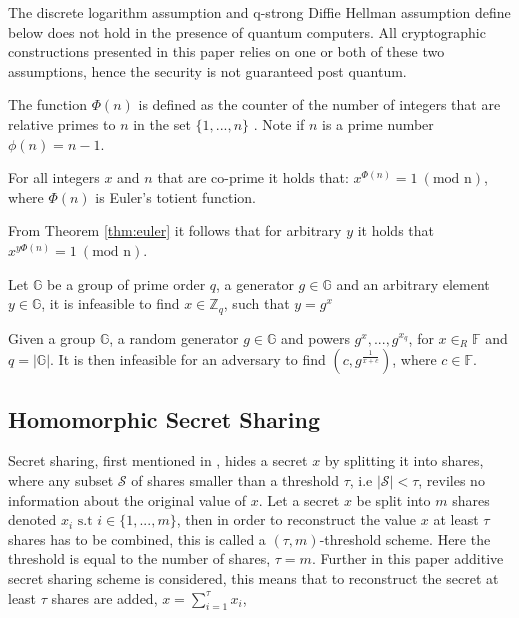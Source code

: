 The discrete logarithm assumption and q-strong Diffie Hellman assumption define below does not hold in the presence of quantum computers. All cryptographic constructions presented in this paper relies on one or both of these two assumptions, hence the security is not guaranteed post quantum. 

\begin{Mydef}
\end{Mydef}

\begin{Mydef}
The function $\Phi(n)$ is defined as the counter of the number of integers that are relative primes to $n$ in the set $\{1,...,n\}$ . Note if $n$ is a prime number $\phi(n) = n-1$.
\end{Mydef}
\vspace{10pt}
\begin{thm}
\label{thm:euler}
For all integers $x$ and $n$ that are co-prime it holds that:
$x^{\Phi(n)} = 1\:( \text{mod n})$, where $\Phi(n)$ is Euler's totient function.
\end{thm}
\vspace{10pt}
From Theorem \ref{thm:euler} it follows that for arbitrary $y$ it holds that $x^{y\Phi(n)} = 1 \:( \text{mod n})$.
\vspace{10pt}

\begin{Ass}
\label{ass:DLA}
Let $\mathds{G}$ be a group of prime order $q$, a generator $g\in \mathds{G}$ and an arbitrary element $y \in\mathds{G}$, it is  infeasible to find $x \in \mathds{Z}_q$, such that $y=g^x$
\end{Ass}
\vspace{10pt}
\begin{Ass}
 Given a group $\mathds{G}$, a random generator $g\in \mathds{G}$ and powers $g^x,...,g^{x_q}$, for $x \in_R \mathds{F}$ and  $q= |\mathds{G}|$. It is then  infeasible for an adversary to find $(c, g^{\frac{1}{x+c}})$, where $c \in \mathds{F}$.
\end{Ass}


\subsection*{Homomorphic Secret Sharing}
Secret sharing, first mentioned in \cite{How_share_A_secret}, hides a secret $x$ by splitting it into shares, where any subset $\mathcal{S}$ of shares smaller than a threshold $\tau$, i.e $|\mathcal{S}|<\tau$, reviles no information about the original value of $x$.  Let a secret $x$ be split into $m$ shares denoted $x_i \text{ s.t } i\in\{1,...,m\}$, then in order to reconstruct the value $x$ at least $\tau$ shares has to be combined, this is called a $(\tau,m)$-threshold scheme. Here the threshold is equal to the number of shares,  $\tau=m$. Further in this paper additive secret sharing scheme is considered, this means that to reconstruct the secret at least $\tau$ shares are added, $x = \sum_{i=1}^\tau x_i$,

